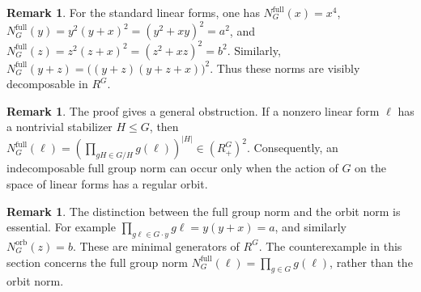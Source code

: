 \documentclass[11pt]{article}
\theoremstyle{definition}
\newtheorem{remark}[theorem]{Remark}
\begin{document}
\begin{remark}
	For the standard linear forms, one has $N_G^{\mathrm{full}}(x)=x^4$, $N_G^{\mathrm{full}}(y)=y^2(y+x)^2=(y^2+xy)^2=a^2$, and $N_G^{\mathrm{full}}(z)=z^2(z+x)^2=(z^2+xz)^2=b^2$.
	Similarly, $N_G^{\mathrm{full}}(y+z)=\bigl((y+z)(y+z+x)\bigr)^2$. Thus these norms are visibly decomposable in \(R^G\).
\end{remark}

\begin{remark}
	The proof gives a general obstruction. If a nonzero linear form $\ell$ has a nontrivial stabilizer $H\leq G$, then $N_G^{\mathrm{full}}(\ell)=
	\left(\prod_{gH\in G/H}g(\ell)\right)^{|H|}
	\in (R^G_+)^2$. Consequently, an indecomposable full group norm can occur only when the action of $G$ on the space of linear forms has a regular orbit.
\end{remark}

\begin{remark}
	The distinction between the full group norm and the orbit norm is essential. For example $\prod_{g\ell\in G\cdot y}g\ell =y(y+x)=a$, and similarly $N_G^{\mathrm{orb}}(z)=b$. These are
	minimal generators of \(R^G\). The counterexample in this section concerns the full group norm $N_G^{\mathrm{full}}(\ell)=\prod_{g\in G}g(\ell)$, rather than the orbit norm.
\end{remark}
\end{document}
